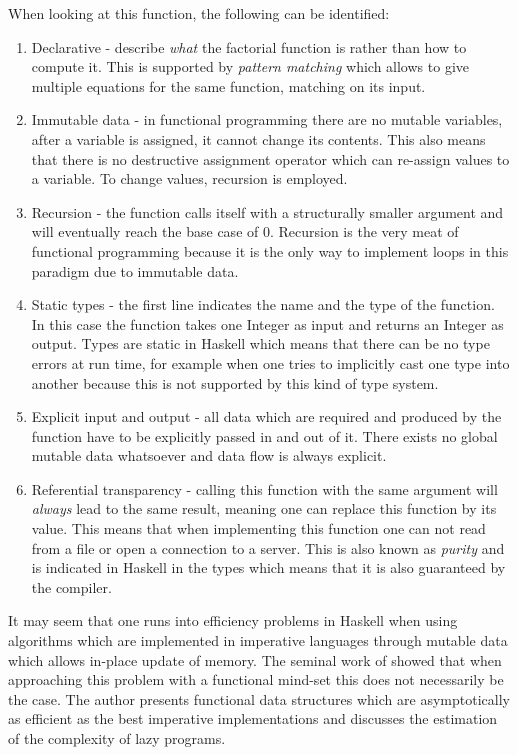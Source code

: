 When looking at this function, the following can be identified: 
\begin{enumerate}
	\item Declarative - describe \textit{what} the factorial function is rather than how to compute it. This is supported by \textit{pattern matching} which allows to give multiple equations for the same function, matching on its input. 
	
	\item Immutable data - in functional programming there are no mutable variables, after a variable is assigned, it cannot change its contents. This also means that there is no destructive assignment operator which can re-assign values to a variable. To change values, recursion is employed.

	\item Recursion - the function calls itself with a structurally smaller argument and will eventually reach the base case of 0. Recursion is the very meat of functional programming because it is the only way to implement loops in this paradigm due to immutable data.
	
	\item Static types - the first line indicates the name and the type of the function. In this case the function takes one Integer as input and returns an Integer as output. Types are static in Haskell which means that there can be no type errors at run time, for example when one tries to implicitly cast one type into another because this is not supported by this kind of type system.

	\item Explicit input and output - all data which are required and produced by the function have to be explicitly passed in and out of it. There exists no global mutable data whatsoever and data flow is always explicit.
	
	\item Referential transparency - calling this function with the same argument will \textit{always} lead to the same result, meaning one can replace this function by its value. This means that when implementing this function one can not read from a file or open a connection to a server. This is also known as \textit{purity} and is indicated in Haskell in the types which means that it is also guaranteed by the compiler.
\end{enumerate}

It may seem that one runs into efficiency problems in Haskell when using algorithms which are implemented in imperative languages through mutable data which allows in-place update of memory. The seminal work of \cite{okasaki_purely_1999} showed that when approaching this problem with a functional mind-set this does not necessarily be the case. The author presents functional data structures which are asymptotically as efficient as the best imperative implementations and discusses the estimation of the complexity of lazy programs.

